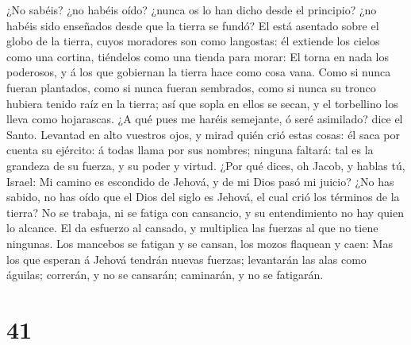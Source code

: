  ¿No sabéis? ¿no habéis oído? ¿nunca os lo han dicho desde
el principio? ¿no habéis sido enseñados desde que la tierra se fundó?
 El está asentado sobre el globo de la tierra, cuyos
moradores son como langostas: él extiende los cielos como una cortina,
tiéndelos como una tienda para morar:  El torna en nada los
poderosos, y á los que gobiernan la tierra hace como cosa vana.
 Como si nunca fueran plantados, como si nunca fueran
sembrados, como si nunca su tronco hubiera tenido raíz en la tierra; así
que sopla en ellos se secan, y el torbellino los lleva como hojarascas.
 ¿A qué pues me haréis semejante, ó seré asimilado? dice el
Santo.  Levantad en alto vuestros ojos, y mirad quién crió
estas cosas: él saca por cuenta su ejército: á todas llama por sus
nombres; ninguna faltará: tal es la grandeza de su fuerza, y su poder y
virtud.  ¿Por qué dices, oh Jacob, y hablas tú, Israel: Mi
camino es escondido de Jehová, y de mi Dios pasó mi juicio?
 ¿No has sabido, no has oído que el Dios del siglo es
Jehová, el cual crió los términos de la tierra? No se trabaja, ni se
fatiga con cansancio, y su entendimiento no hay quien lo alcance.
 El da esfuerzo al cansado, y multiplica las fuerzas al que
no tiene ningunas.  Los mancebos se fatigan y se cansan,
los mozos flaquean y caen:  Mas los que esperan á Jehová
tendrán nuevas fuerzas; levantarán las alas como águilas; correrán, y no
se cansarán; caminarán, y no se fatigarán.

\hypertarget{section-40}{%
\section{41}\label{section-40}}

